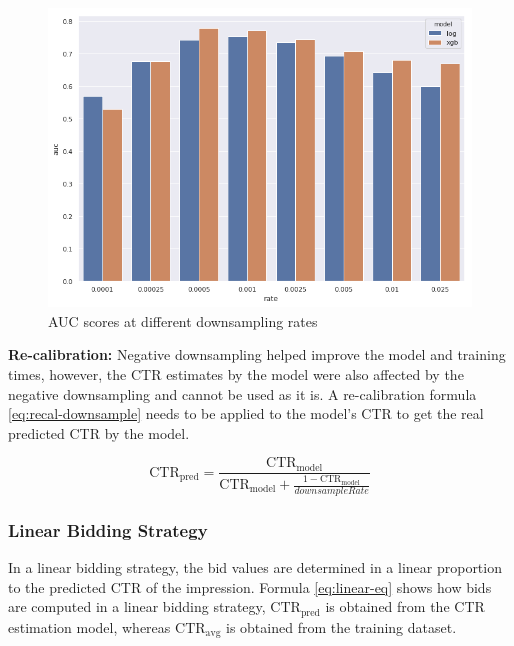 \documentclass{sig-alternate-05-2015}
\begin{document}
\begin{figure}[h!]
	\centering
	\includegraphics[scale=0.25]{images/model_auc.png}
	\caption{AUC scores at different downsampling rates}
	\label{fig:downsample-auc-score}
\end{figure}

\textbf{Re-calibration:} Negative downsampling helped improve the model and training times, however, the CTR estimates by the model were also affected by the negative downsampling and cannot be used as it is. A re-calibration formula \ref{eq:recal-downsample} needs to be applied to the model's CTR to get the real predicted CTR \cite{he_practical_2014} by the model.

\begin{equation}\label{eq:recal-downsample}
   \mathrm{CTR}_\mathrm{pred} =  \frac{\mathrm{CTR}_\mathrm{model}}{\mathrm{CTR}_\mathrm{model} + \frac{1 - \mathrm{CTR}_\mathrm{model}}{downsampleRate}}
\end{equation}

\subsubsection{Linear Bidding Strategy}
In a linear bidding strategy, the bid values are determined in a linear proportion to the predicted CTR of the impression. Formula \ref{eq:linear-eq} shows how bids are computed in a linear bidding strategy, $\mathrm{CTR}_\mathrm{pred}$ is obtained from the CTR estimation model, whereas $\mathrm{CTR}_\mathrm{avg}$ is obtained from the training dataset. 
\end{document}
